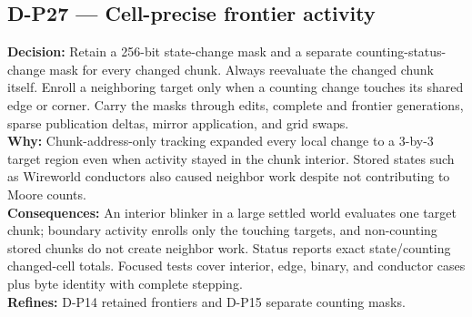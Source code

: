 \subsection*{D-P27 --- Cell-precise frontier activity}
\begin{decisionbox}[title={D-P27 \quad 2026-08-11}]
\textbf{Decision:} Retain a 256-bit state-change mask and a separate
counting-status-change mask for every changed chunk. Always reevaluate the
changed chunk itself. Enroll a neighboring target only when a counting change
touches its shared edge or corner. Carry the masks through edits, complete and
frontier generations, sparse publication deltas, mirror application, and grid
swaps.\\
\textbf{Why:} Chunk-address-only tracking expanded every local change to a
3-by-3 target region even when activity stayed in the chunk interior. Stored
states such as Wireworld conductors also caused neighbor work despite not
contributing to Moore counts.\\
\textbf{Consequences:} An interior blinker in a large settled world evaluates
one target chunk; boundary activity enrolls only the touching targets, and
non-counting stored chunks do not create neighbor work. Status reports exact
state/counting changed-cell totals. Focused tests cover interior, edge, binary,
and conductor cases plus byte identity with complete stepping.\\
\textbf{Refines:} D-P14 retained frontiers and D-P15 separate counting masks.
\end{decisionbox}

